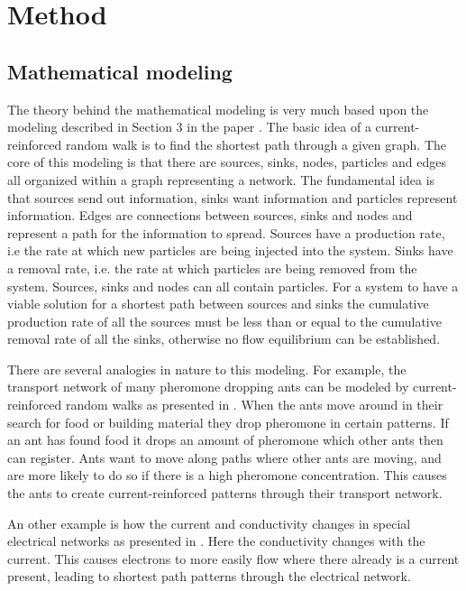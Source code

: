 \section{Method}
\label{sec:method}

\subsection{Mathematical modeling}
The theory behind the mathematical modeling is very much based upon the modeling described in Section 3 in the paper \cite{Current}. The basic idea of a current-reinforced random walk is to find the shortest path through a given graph. The core of this modeling is that there are sources, sinks, nodes, particles and edges all organized within a graph representing a network. The fundamental idea is that sources send out information, sinks want information and particles represent information. Edges are connections between sources, sinks and nodes and represent a path for the information to spread. Sources have a production rate, i.e the rate at which new particles are being injected into the system. Sinks have a removal rate, i.e. the rate at which particles are being removed from the system. Sources, sinks and nodes can all contain particles. For a system to have a viable solution for a shortest path between sources and sinks the cumulative production rate of all the sources must be less than or equal to the cumulative removal rate of all the sinks, otherwise no flow equilibrium can be established.

There are several analogies in nature to this modeling. For example, the transport network of many pheromone dropping ants can be modeled by current-reinforced random walks as presented in \cite{Schweitzer1997153}. When the ants move around in their search for food or building material they drop pheromone in certain patterns. If an ant has found food it drops an amount of pheromone which other ants then can register. Ants want to move along paths where other ants are moving, and are more likely to do so if there is a high pheromone concentration. This causes the ants to create current-reinforced patterns through their transport network.

An other example is how the current and conductivity changes in special electrical networks as presented in \cite{Doyle}. Here the conductivity changes with the current. This causes electrons to more easily flow where there already is a current present, leading to shortest path patterns through the electrical network. 

